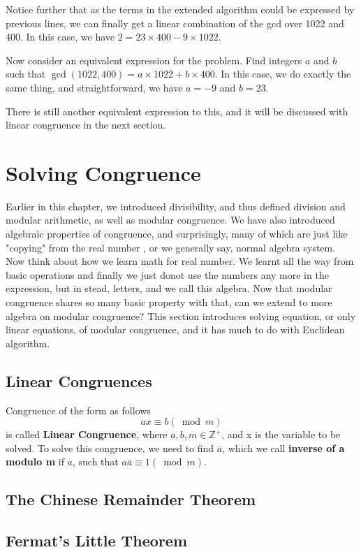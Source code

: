         Notice further that as the terms in the extended algorithm could be expressed by previous lines, we can finally get a linear combination
        of the gcd over 1022 and 400. In this case, we have $2 = 23\times 400-9\times 1022$.

        Now consider an equivalent expression for the problem.  Find integers $a$ and $b$ such that $\gcd(1022, 400) = a \times 1022 + b \times 400$.
        In this case, we do exactly the same thing, and straightforward, we have $a=-9$ and $b=23$.

        There is still another equivalent expression to this, and it will be discussed with linear congruence in the next section.



    \section{Solving Congruence}
        Earlier in this chapter, we introduced divisibility, and thus defined division and modular arithmetic, as well as modular congruence.
        We have also introduced algebraic properties of congruence, and surprisingly, many of which are just like "copying" from the real number
        , or we generally say, normal algebra system. Now think about how we learn math for real number. We learnt all the way from basic operations
        and finally we just donot use the numbers any more in the expression, but in stead, letters, and we call this algebra. Now that modular congruence
        shares so many basic property with that, can we extend to more algebra on modular congruence? This section introduces solving equation, or only
        linear equations, of modular congruence, and it has much to do with Euclidean algorithm.
            

        \subsection{Linear Congruences}
            \begin{definition}
                Congruence of the form as follows
                $$ax \equiv b (\bmod m)$$
                is called \textbf{Linear Congruence}, where $a, b,  m \in \mathbb{Z}^+$, and x is the variable to be solved.
                To solve this congruence, we need to find $\bar{a}$, which we call \textbf{inverse of a modulo m} if $a$, such that
                $a\bar{a} \equiv 1 (\bmod m)$.
            \end{definition}
        \subsection{The Chinese Remainder Theorem}



        \subsection{Fermat's Little Theorem}